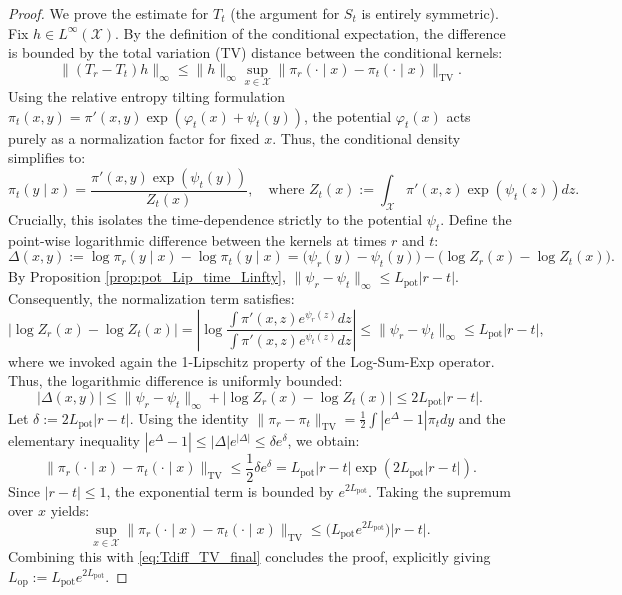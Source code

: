 \documentclass[11pt]{article}
\theoremstyle{definition}
\numberwithin{equation}{section}%
\begin{document}
{\begin{proof}
We prove the estimate for $T_t$ (the argument for $S_t$ is entirely symmetric). Fix $h \in L^\infty(\mathcal{X})$. By the definition of the conditional expectation, the difference is bounded by the total variation (TV) distance between the conditional kernels:
\begin{equation}
\label{eq:Tdiff_TV_final}
\|(T_r - T_t)h\|_\infty \le \|h\|_\infty \sup_{x \in \mathcal{X}} \|\pi_r(\cdot \mid x) - \pi_t(\cdot \mid x)\|_{\mathrm{TV}}.
\end{equation}
Using the relative entropy tilting formulation $\pi_t(x,y) = \pi'(x,y) \exp(\varphi_t(x) + \psi_t(y))$, the potential $\varphi_t(x)$ acts purely as a normalization factor for fixed $x$. Thus, the conditional density simplifies to:
\[
\pi_t(y \mid x) = \frac{\pi'(x,y) \exp(\psi_t(y))}{Z_t(x)}, \quad \text{where } Z_t(x) := \int_{\mathcal{X}} \pi'(x,z) \exp(\psi_t(z)) dz.
\]
Crucially, this isolates the time-dependence strictly to the potential $\psi_t$. Define the point-wise logarithmic difference between the kernels at times $r$ and $t$:
\[
\Delta(x,y) := \log \pi_r(y \mid x) - \log \pi_t(y \mid x) = \big(\psi_r(y) - \psi_t(y)\big) - \big(\log Z_r(x) - \log Z_t(x)\big).
\]
By Proposition \ref{prop:pot_Lip_time_Linfty}, $\|\psi_r - \psi_t\|_\infty \le L_{\mathrm{pot}} |r - t|$. Consequently, the normalization term satisfies:
\[
|\log Z_r(x) - \log Z_t(x)| = \left| \log \frac{\int \pi'(x,z) e^{\psi_r(z)} dz}{\int \pi'(x,z) e^{\psi_t(z)} dz} \right| \le \|\psi_r - \psi_t\|_\infty \le L_{\mathrm{pot}} |r - t|,
\]
where we invoked again the 1-Lipschitz property of the Log-Sum-Exp operator. Thus, the logarithmic difference is uniformly bounded:
\[
|\Delta(x,y)| \le \|\psi_r - \psi_t\|_\infty + |\log Z_r(x) - \log Z_t(x)| \le 2 L_{\mathrm{pot}} |r - t|.
\]
Let $\delta := 2 L_{\mathrm{pot}} |r - t|$. Using the identity $\|\pi_r - \pi_t\|_{\mathrm{TV}} = \frac{1}{2} \int |e^{\Delta} - 1| \pi_t dy$ and the elementary inequality $|e^\Delta - 1| \le |\Delta| e^{|\Delta|} \le \delta e^\delta$, we obtain:
\[
\|\pi_r(\cdot \mid x) - \pi_t(\cdot \mid x)\|_{\mathrm{TV}} \le \frac{1}{2} \delta e^\delta = L_{\mathrm{pot}} |r - t| \exp(2 L_{\mathrm{pot}} |r - t|).
\]
Since $|r - t| \le 1$, the exponential term is bounded by $e^{2 L_{\mathrm{pot}}}$. Taking the supremum over $x$ yields:
\[
\sup_{x \in \mathcal{X}} \|\pi_r(\cdot \mid x) - \pi_t(\cdot \mid x)\|_{\mathrm{TV}} \le \big( L_{\mathrm{pot}} e^{2 L_{\mathrm{pot}}} \big) |r - t|.
\]
Combining this with \eqref{eq:Tdiff_TV_final} concludes the proof, explicitly giving $L_{\mathrm{op}} := L_{\mathrm{pot}} e^{2 L_{\mathrm{pot}}}$.
\end{proof}

}
\end{document}
